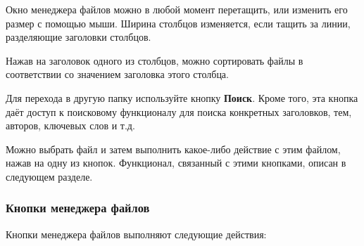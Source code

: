 ﻿\documentclass[a4paper,10pt]{article}
\begin{document}
Окно менеджера файлов можно в любой момент перетащить, или изменить его размер с помощью мыши. Ширина столбцов изменяется, если тащить за линии, разделяющие заголовки столбцов. 

Нажав на заголовок одного из столбцов, можно сортировать файлы в соответствии со значением заголовка этого столбца.

Для перехода в другую папку используйте кнопку \textbf{Поиск}. Кроме того, эта кнопка даёт доступ к поисковому функционалу для поиска конкретных заголовков, тем, авторов, ключевых слов и т.д.

Можно выбрать файл и затем выполнить какое-либо действие с этим файлом, нажав на одну из кнопок. Функционал, связанный с этими кнопками, описан в следующем разделе.

\subsubsection{Кнопки менеджера файлов}
Кнопки менеджера файлов выполняют следующие действия:
\end{document}
